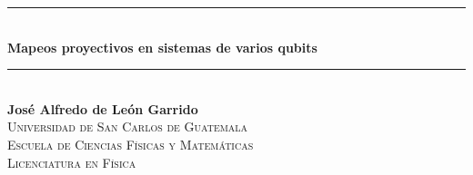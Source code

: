 \documentclass[11pt,dvipsnames]{report} %
\newcommand{\1}{\mathds{1}}
\begin{document}
\begin{titlepage} %
\newcommand{\HRule}{\rule{\linewidth}{0.6mm}} %

\center %


\HRule\\[0.4cm]

{\LARGE\bfseries Mapeos proyectivos en sistemas de varios qubits}\\[0.4cm] 

\HRule\\[2cm]



\Large{\textbf{José Alfredo de León Garrido}}\\[2cm]


\textsc{\Large Universidad de San Carlos de Guatemala\\
		Escuela de Ciencias Físicas y Matemáticas\\
		Licenciatura en Física}\\[2cm]


\end{titlepage}
\end{document}
